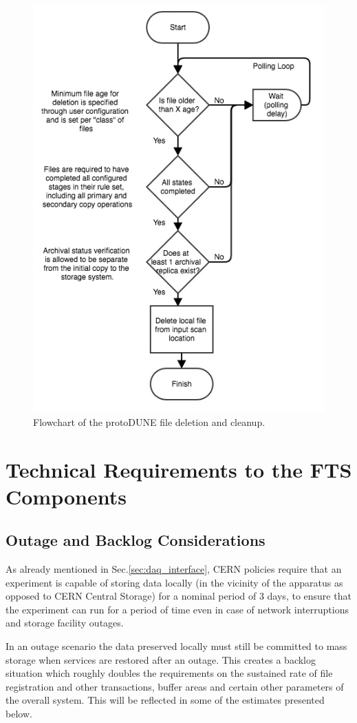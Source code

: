 \documentclass[12pt]{article}
\newcommand{\pd}{protoDUNE\xspace}
\begin{document}
\begin{figure}[tbh]
  \centering
  \includegraphics[width=0.55\linewidth]{figures/fts_file_deletion_flowchart.png}  
  \caption{Flowchart of the \pd file deletion and cleanup.}
  \label{fig:ftscleanup}
\end{figure}


 
\section{Technical Requirements to the FTS Components}

\subsection{Outage and Backlog Considerations}
\label{sec:backlog}
As already mentioned in Sec.\ref{sec:daq_interface},
CERN policies require that an experiment is capable of storing data locally (in the vicinity of the apparatus as opposed to CERN Central
Storage)  for a nominal period of 3 days, to ensure that the experiment can run for a period of time even in case of network interruptions
and storage facility outages.

In an outage scenario the data preserved locally must still be committed to mass storage when services are
restored after an outage. This creates a backlog situation which roughly doubles the requirements on the sustained
rate of file registration and other transactions, buffer areas and certain other parameters of the overall system.
This will be reflected in some of the estimates presented below.
\end{document}
